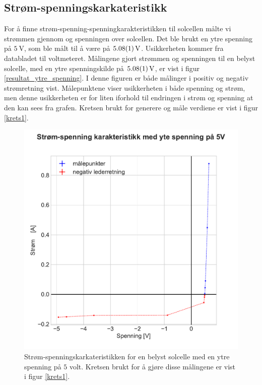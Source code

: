 \documentclass[%
 reprint,
 amsmath,amssymb,
 aps,
 norsk,
 booktabs
]{revtex4-1}
\begin{document}
\subsection{Strøm-spenningskarkateristikk}
For å finne strøm-spenning-spenningkarakteristikken til solcellen målte vi strømmen gjennom og spenningen over solcellen. Det ble brukt en ytre spenning på $\SI{5}{\volt}$, som ble målt til å være på $\SI{5.08\pm0.01}{\volt}$. Usikkerheten kommer fra databladet til voltmeteret. Målingene gjort strømmen og spenningen til en belyst solcelle, med en ytre spenningskilde på $\SI{5.08\pm0.01}{\volt}$, er vist i figur \vref{resultat_ytre_spenning}. I denne figuren er både målinger i positiv og negativ strømretning vist. Målepunktene viser usikkerheten i både spenning og strøm, men denne usikkerheten er for liten iforhold til endringen i strøm og spenning at den kan sees fra grafen. Kretsen brukt for generere og måle verdiene er vist i figur \vref{krets1}. \\
\begin{figure}
  \centering
  \includegraphics[scale=0.47]{ytre_spenning.pdf}
  \caption{Strøm-spenningskarkateristikken for en belyst solcelle med en ytre spenning på $5$ volt. Kretsen brukt for å gjøre disse målingene er vist i figur \vref{krets1}.}
  \label{resultat_ytre_spenning}
\end{figure}
\end{document}

